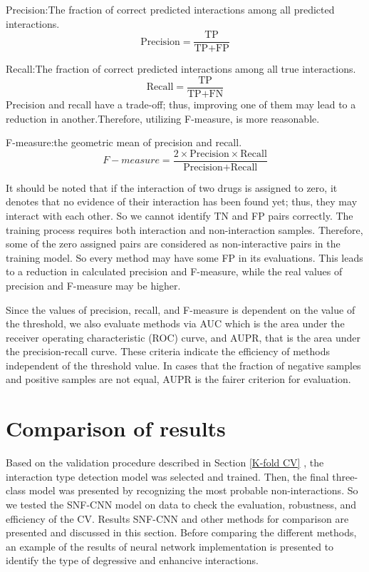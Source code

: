 \documentclass{bmcart}
\begin{document}
Precision:The fraction of correct predicted interactions among all predicted interactions.
$$ \mbox{Precision} =  \frac{\mbox{TP}}{\mbox{TP} + \mbox{FP}} $$

Recall:The fraction of correct predicted interactions among all true interactions.
$$ \mbox{Recall} =  \frac{ \mbox{TP}}{\mbox{TP} + \mbox{FN}} $$
Precision and recall have a trade-off; thus, improving one of them may lead to a reduction in another.Therefore, utilizing F-measure, is more reasonable.

F-measure:the geometric mean of precision and recall.
$$ F-measure = \frac{ 2\times \mbox{Precision} \times \mbox{Recall}}{\mbox{Precision} + \mbox{Recall}} $$

It should be noted that if the interaction of two drugs is assigned to zero, it denotes that no evidence of their interaction has been found yet; thus, they may interact with each other. So we cannot identify TN and FP pairs correctly. The training process requires both interaction and non-interaction samples. Therefore, some of the zero assigned pairs are considered as non-interactive pairs in the training model. So every method may have some FP in its evaluations. This leads to a reduction in calculated precision and F-measure, while the real values of precision and F-measure may be higher.

Since the values of precision, recall, and F-measure is dependent on the value of the threshold, we also evaluate methods via AUC which is the area under the receiver operating characteristic (ROC) curve, and AUPR, that is the area under the precision-recall curve. These criteria indicate the efficiency of methods independent of the threshold value. In cases that the fraction of negative samples and positive samples are not equal, AUPR is the fairer criterion for evaluation.


 


\section*{Comparison of results}
Based on the validation procedure described in Section
\ref{K-fold CV}
, the interaction type detection model was selected and trained. Then, the final three-class model was presented by recognizing the most probable non-interactions. So we tested the SNF-CNN model on data to check the evaluation, robustness, and efficiency of the CV. Results SNF-CNN and other methods for comparison are presented and discussed in this section. Before comparing the different methods, an example of the results of neural network implementation is presented to identify the type of degressive and enhancive interactions.
\end{document}
